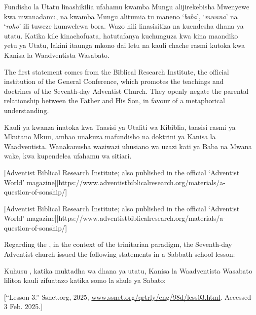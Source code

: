 Fundisho la Utatu linashikilia ufahamu kwamba Mungu alijirekebisha Mwenyewe kwa mwanadamu, na kwamba Mungu alitumia tu maneno ‘\textit{baba}’, ‘\textit{mwana}’ na ‘\textit{roho}’ ili tuweze kumwelewa bora. Wazo hili linasisitiza na kuendesha dhana ya utatu. Katika kile kinachofuata, hatutafanya kuchunguza kwa kina maandiko yetu ya Utatu, lakini itaunga mkono dai letu na kauli chache rasmi kutoka kwa Kanisa la Waadventista Wasabato.


The first statement comes from the Biblical Research Institute, the official institution of the General Conference, which promotes the teachings and doctrines of the Seventh-day Adventist Church. They openly negate the parental relationship between the Father and His Son, in favour of a metaphorical understanding.


Kauli ya kwanza inatoka kwa Taasisi ya Utafiti wa Kibiblia, taasisi rasmi ya Mkutano Mkuu, ambao unakuza mafundisho na doktrini ya Kanisa la Waadventista. Wanakanusha waziwazi uhusiano wa uzazi kati ya Baba na Mwana wake, kwa kupendelea ufahamu wa sitiari.


[Adventist Biblical Research Institute; also published in the official ‘Adventist World’ magazine][https://www.adventistbiblicalresearch.org/materials/a-question-of-sonship/]


[Adventist Biblical Research Institute; also published in the official ‘Adventist World’ magazine][https://www.adventistbiblicalresearch.org/materials/a-question-of-sonship/]


Regarding the , in the context of the trinitarian paradigm, the Seventh-day Adventist church issued the following statements in a Sabbath school lesson:


Kuhusu , katika muktadha wa dhana ya utatu, Kanisa la Waadventista Wasabato lilitoa kauli zifuatazo katika somo la shule ya Sabato:


[“Lesson 3.” Ssnet.org, 2025, \href{http://www.ssnet.org/qrtrly/eng/98d/less03.html}{www.ssnet.org/qrtrly/eng/98d/less03.html}. Accessed 3 Feb. 2025.]


